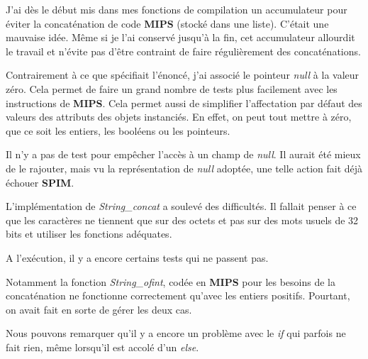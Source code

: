 \documentclass{article}
\begin{document}
J'ai dès le début mis dans mes fonctions de compilation un accumulateur pour éviter la
concaténation de code \textbf{MIPS} (stocké dans une liste). C'était une
mauvaise idée. Même si je l'ai conservé jusqu'à la fin, cet accumulateur
allourdit le travail et n'évite pas d'être contraint de faire régulièrement
des concaténations.

Contrairement à ce que spécifiait l'énoncé, j'ai associé le pointeur
\emph{null} à
la valeur zéro. Cela permet de faire un grand nombre de tests plus
facilement avec les instructions de \textbf{MIPS}. Cela permet aussi de
simplifier l'affectation par défaut des valeurs des attributs des objets
instanciés. En effet, on peut tout mettre à zéro, que ce soit les entiers,
les booléens ou les pointeurs.

Il n'y a pas de test pour empêcher l'accès à un champ de \emph{null}. Il
aurait
été mieux de le rajouter, mais vu la représentation de \emph{null} adoptée,
une telle action fait déjà échouer \textbf{SPIM}.

L'implémentation de \emph{String\_concat} a soulevé des difficultés. Il
fallait penser à ce que les caractères ne tiennent que sur des octets et
pas sur des mots usuels de 32 bits et utiliser les fonctions adéquates.

A l'exécution, il y a encore certains tests qui ne passent pas.

Notamment la fonction \emph{String\_ofint}, codée en \textbf{MIPS} pour les
besoins de la concaténation ne fonctionne correctement qu'avec les entiers
positifs. Pourtant, on avait fait en sorte de gérer les deux cas.

Nous pouvons remarquer qu'il y a encore un problème avec le \emph{if} qui
parfois ne fait rien, même lorsqu'il est accolé d'un \emph{else}.
\end{document}
